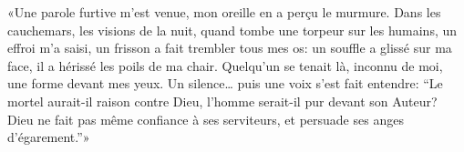 «Une parole furtive m’est venue, mon oreille en a perçu le murmure.
Dans les cauchemars, les visions de la nuit, quand tombe une torpeur sur les humains,
	un effroi m’a saisi, un frisson a fait trembler tous mes os:
	un souffle a glissé sur ma face, il a hérissé les poils de ma chair.
Quelqu’un se tenait là, inconnu de moi, une forme devant mes yeux.
	Un silence… puis une voix s’est fait entendre:
	“Le mortel aurait-il raison contre Dieu, l’homme serait-il pur devant son Auteur?
	Dieu ne fait pas même confiance à ses serviteurs, et persuade ses anges d’égarement.”»
